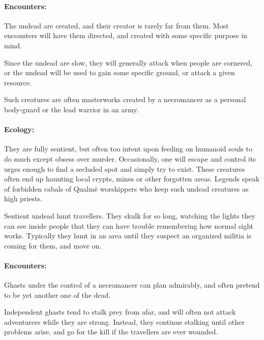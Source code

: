 \begin{multicols}{2}

\paragraph{Encounters:}
The undead are created, and their creator is rarely far from them.
Most encounters will have them directed, and created with some specific purpose in mind.

Since the undead are slow, they will generally attack when people are cornered, or the undead will be used to gain some specific ground, or attack a given resource.

\label{ghast}

Such creatures are often masterworks created by a necromancer as a personal body-guard or the lead warrior in an army.


\paragraph{Ecology:} They are fully sentient, but often too intent upon feeding on humanoid souls to do much except obsess over murder.
Occasionally, one will escape and control its urges enough to find a secluded spot and simply try to exist.
These creatures often end up haunting local crypts, mines or other forgotten areas.
Legends speak of forbidden cabals of Qualm\"{e} worshippers who keep such undead creatures as high priests.

Sentient undead hunt travellers.  They skulk for so long, watching the lights they can see inside people that they can have trouble remembering how normal sight works.  Typically they hunt in an area until they suspect an organized militia is coming for them, and move on.

\paragraph{Encounters:}  Ghasts under the control of a necromancer can plan admirably, and often pretend to be yet another one of the dead.

Independent ghasts tend to stalk prey from afar, and will often not attack adventurers while they are strong.
Instead, they continue stalking until other problems arise, and go for the kill if the travellers are ever wounded.

\end{multicols}

